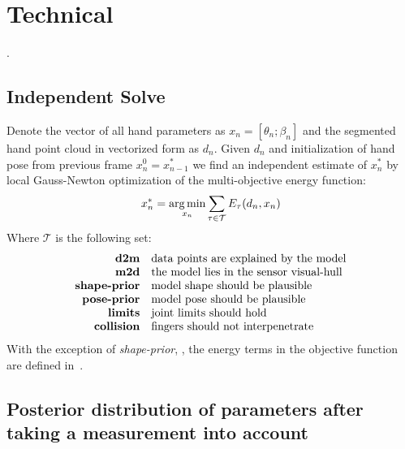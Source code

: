\section{Technical}

.


\subsection{Independent Solve}
\label{sec:independent}
% 
Denote the vector of all hand parameters as $x_n = [\theta_n; \beta_n]$ and the segmented hand point cloud in vectorized form as $d_n$. Given $d_n$ and initialization of hand pose from previous frame $x_n^0 = x_{n - 1}^*$ we find an independent estimate of $x_n^*$ by local Gauss-Newton optimization of the multi-objective energy function:
% 
\begin{equation}
x_n^* = \operatorname*{arg\,min}_{x_n} \sum_{\tau \in \mathcal{T}} E_{\tau}(d_n, x_n) \label{eq:energies}
\end{equation}
% 
Where $\mathcal{T}$ is the following set:
%
\vspace{-.5\parskip}
\begin{equation*}
\setlength{\jot}{0pt}
\begin{aligned}
\text{\textbf{d2m}} & \quad \text{data points are explained by the model} \\ 
\text{\textbf{m2d}} & \quad \text{the model lies in the sensor visual-hull} \\
\text{\textbf{shape-prior}} & \quad \text{model shape should be plausible} \\
\text{\textbf{pose-prior}} & \quad \text{model pose should be plausible} \\
\text{\textbf{limits}} & \quad \text{joint limits should hold} \\
\text{\textbf{collision}} & \quad \text{fingers should not interpenetrate} 
\end{aligned}
\end{equation*}
With the exception of \emph{shape-prior}, , the energy terms in the objective function are defined in~\cite{tkach2016sphere}.

\subsection{Posterior distribution of parameters after taking a measurement into account} \label{sec:posterior}


